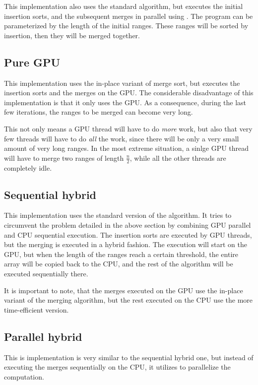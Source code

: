 \documentclass[10pt,a4paper]{article}
\begin{document}
	This implementation also uses the standard algorithm, but executes the initial insertion sorts, and the subsequent merges in parallel using . The program can be parameterized by the length of the initial ranges. These ranges will be sorted by insertion, then they will be merged together.
	
	\subsection{Pure GPU}
	
	This implementation uses the in-place variant of merge sort, but executes the insertion sorts and the merges on the GPU. The considerable disadvantage of this implementation is that it only uses the GPU. As a consequence, during the last few iterations, the ranges to be merged can become very long. 
	
	This not only means a GPU thread will have to do \textit{more} work, but also that very few threads will have to do \textit{all} the work, since there will be only a very small amount of very long ranges. In the most extreme situation, a sinlge GPU thread will have to merge two ranges of length $\frac{n}{2}$, while all the other threads are completely idle.
	
	\subsection{Sequential hybrid}
	
	This implementation uses the standard version of the algorithm. It tries to circumvent the problem detailed in the above section by combining GPU parallel and CPU sequential execution. The insertion sorts are executed by GPU threads, but the merging is executed in a hybrid fashion. The execution will start on the GPU, but when the length of the ranges reach a certain threshold, the entire array will be copied back to the CPU, and the rest of the algorithm will be executed sequentially there.
	
	It is important to note, that the merges executed on the GPU use the in-place variant of the merging algorithm, but the rest executed on the CPU use the more time-efficient version.
	
	\subsection{Parallel hybrid}
	
	This is implementation is very similar to the sequential hybrid one, but instead of executing the merges sequentially on the CPU, it utilizes  to parallelize the computation.
	
\end{document}
